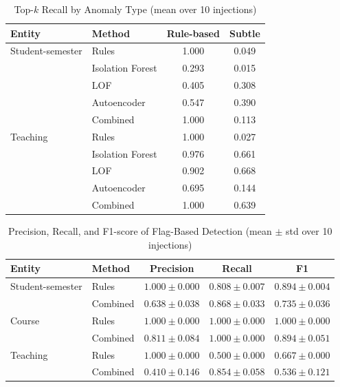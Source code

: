 \documentclass[conference]{IEEEtran}
\begin{document}
\begin{table}[htbp]
\caption{Top-$k$ Recall by Anomaly Type (mean over 10 injections)}
\begin{center}
\begin{tabular}{llcc}
\toprule
\textbf{Entity} & \textbf{Method} & \textbf{Rule-based} & \textbf{Subtle} \\
\midrule
Student-semester & Rules & 1.000 & 0.049 \\
 & Isolation Forest & 0.293 & 0.015 \\
 & LOF & 0.405 & 0.308 \\
 & Autoencoder & 0.547 & 0.390 \\
 & Combined & 1.000 & 0.113 \\
\midrule
Teaching & Rules & 1.000 & 0.027 \\
 & Isolation Forest & 0.976 & 0.661 \\
 & LOF & 0.902 & 0.668 \\
 & Autoencoder & 0.695 & 0.144 \\
 & Combined & 1.000 & 0.639 \\
\bottomrule
\end{tabular}
\label{tab:subtle}
\end{center}
\end{table}

\begin{table}[htbp]
\caption{Precision, Recall, and F1-score of Flag-Based Detection (mean $\pm$ std over 10 injections)}
\begin{center}
\footnotesize\setlength{\tabcolsep}{2pt}
\begin{tabular}{llccc}
\toprule
\textbf{Entity} & \textbf{Method} & \textbf{Precision} & \textbf{Recall} & \textbf{F1} \\
\midrule
Student-semester & Rules & $1.000{\pm}0.000$ & $0.808{\pm}0.007$ & $0.894{\pm}0.004$ \\
 & Combined & $0.638{\pm}0.038$ & $0.868{\pm}0.033$ & $0.735{\pm}0.036$ \\
\midrule
Course & Rules & $1.000{\pm}0.000$ & $1.000{\pm}0.000$ & $1.000{\pm}0.000$ \\
 & Combined & $0.811{\pm}0.084$ & $1.000{\pm}0.000$ & $0.894{\pm}0.051$ \\
\midrule
Teaching & Rules & $1.000{\pm}0.000$ & $0.500{\pm}0.000$ & $0.667{\pm}0.000$ \\
 & Combined & $0.410{\pm}0.146$ & $0.854{\pm}0.058$ & $0.536{\pm}0.121$ \\
\bottomrule
\end{tabular}
\label{tab:prf}
\end{center}
\end{table}
\end{document}

